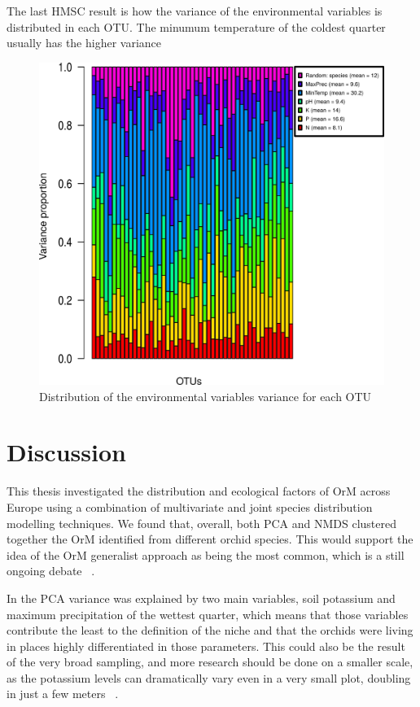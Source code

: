 The last HMSC result is how the variance of the environmental variables is distributed in each OTU. The minumum temperature of the coldest quarter usually has the higher variance

\begin{figure}[htbp]
\centering
\includegraphics[keepaspectratio,width=\textwidth,height=0.75\textheight]{images/varDistribution00.png}
\caption{Distribution of the environmental variables variance for each OTU}
\end{figure}

\part{Discussion}
\label{discussion}

This thesis investigated the distribution and ecological factors of OrM across Europe using a combination of multivariate and joint species distribution modelling techniques. We found that, overall, both PCA and NMDS clustered together the OrM identified from different orchid species. This would support the idea of the OrM generalist approach as being the most common, which is a still ongoing debate ~\citep{bailarote2012}.

In the PCA variance was explained by two main variables, soil potassium and maximum precipitation of the wettest quarter, which means that those variables contribute the least to the definition of the niche and that the orchids were living in places highly differentiated in those parameters. This could also be the result of the very broad sampling, and more research should be done on a smaller scale, as the potassium levels can dramatically vary even in a very small plot, doubling in just a few meters ~\citep{bogunovic2014}.


